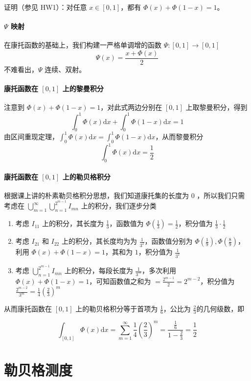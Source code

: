 \documentclass{ctexbook}
\newcommand{\no}{\noindent}
\newcommand{\EXP}{\no {\bf 例}\quad}
\newcommand{\ITEMS}{\begin{enumerate}[leftmargin=4em]}
\newcommand{\ITEME}{\end{enumerate}}
\begin{document}
\EXP 证明（参见 HW1）：对任意 $x\in [0,1]$，都有 $\varPhi(x) + \varPhi(1-x)=1$。

\subsubsection{$\varPsi$ 映射}

在康托函数的基础上，我们构建一严格单调增的函数 $\varPsi:[0,1] \to [0,1]$
\[
\varPsi(x) =  \frac{x+\varPhi(x)}{2}
\]
不难看出，$\varPsi$ 连续、双射。

\subsubsection{康托函数在 $[0, 1]$ 上的黎曼积分}

注意到 $\varPhi(x) + \varPhi(1-x)=1$，对此式两边分别在 $[0, 1]$ 上取黎曼积分，得到
$$\int_{0}^{1}\varPhi(x)\mathrm{d} x + \int_{0}^{1}\varPhi(1-x)\mathrm{d} x=1$$
由区间重现定理，$\int_{0}^{1}\varPhi(x)\mathrm{d} x=\int_{0}^{1}\varPhi(1-x)\mathrm{d} x$，从而黎曼积分
$$\int_{0}^{1}\varPhi(x)\mathrm{d} x=\frac12 $$

\subsubsection{康托函数在 $[0, 1]$ 上的勒贝格积分}
根据课上讲的朴素勒贝格积分思想，我们知道康托集的长度为 $0$ ，所以我们只需考虑在 $\bigcup\limits_{m=1}^\infty\bigcup\limits_{n=1}^{2^{m-1}}I_{mn}$ 上的积分，我们逐步分类
\ITEMS
\item 考虑 $I_{11}$ 上的积分，其长度为 $\frac{1}{3}$，函数值为 $\varPhi(\frac13) = \frac12$，积分值为 $\frac13 \cdot \frac12$
\item 考虑 $I_{21}$ 和 $I_{22}$ 上的积分，其长度均为为 $\frac{1}{3^2}$，函数值分别为 $\varPhi(\frac19), \varPhi(\frac89)$，利用 $\varPhi(x) + \varPhi(1-x)=1$，其和为 $1$，积分值为 $\frac{1}{3^2}$
\item 考虑 $\bigcup\limits_{n=1}^{2^{m-1}} I_{mn}$ 上的积分，每段长度为 $\frac{1}{3^m}$，多次利用 $\varPhi(x) + \varPhi(1-x)=1$，可知函数值之和为 $=\frac {2^{m-1}}{2}=2^{m-2}$，积分值为 $\frac{2^{m-2}}{3^m} = \frac14 \left(\frac23\right)^m$
\ITEME
从而康托函数在 $[0, 1]$ 上的勒贝格积分等于首项为 $\frac 16$，公比为 $\frac23$的几何级数，即

\[
\int_{[0,1]} \varPhi(x) \mathrm{d} x = \sum_{m=1}^\infty \frac14 \left(\frac23\right)^m = \frac{\frac16}{1-\frac23}=\frac12
\]

\chapter{勒贝格测度}
\end{document}
